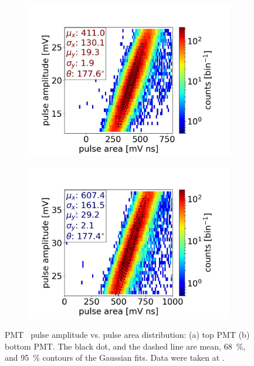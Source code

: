 \begin{figure}[!p]
	\centering
	\begin{subfigure}[b]{\twofigurewidth}
		\centering
		\includegraphics[width=\textwidth,clip,trim={0 0 0 0},angle=0,origin=c]{Figures/GasTest/DatasetQuality/topPMTArea65831.jpg}
		\caption{}
		\label{fig:PMTAmpArea top}
	\end{subfigure}
	\begin{subfigure}[b]{\twofigurewidth}
		\centering
		\includegraphics[width=\textwidth,clip,trim={0 0 0 0}]{Figures/GasTest/DatasetQuality/botPMTArea65831.jpg}
		\caption{}
		\label{fig:PMTAmpArea bottom}
	\end{subfigure}
	\caption[PMT \sphe\ pulse amplitude vs. pulse area distribution.]{PMT \sphe\ pulse amplitude vs. pulse area distribution: (a) top PMT (b) bottom PMT. The black dot, and the dashed line are mean, \SI{68}{\percent}, and \SI{95}{\percent} contours of the Gaussian fits. Data were taken at .}
	\label{fig:PMTAmpArea}
\end{figure}

